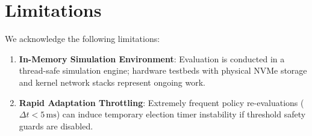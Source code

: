 \section{Limitations}
\label{sec:limitations}

We acknowledge the following limitations:
\begin{enumerate}
    \item \textbf{In-Memory Simulation Environment}: Evaluation is conducted in a thread-safe simulation engine; hardware testbeds with physical NVMe storage and kernel network stacks represent ongoing work.
    \item \textbf{Rapid Adaptation Throttling}: Extremely frequent policy re-evaluations ($\Delta t < 5\,\text{ms}$) can induce temporary election timer instability if threshold safety guards are disabled.
\end{enumerate}
